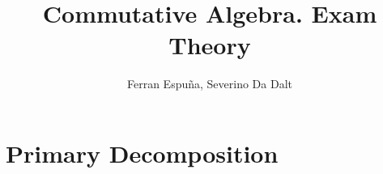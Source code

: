 \documentclass[11pt]{article}
\title{Commutative Algebra. Exam Theory}
\author{Ferran Espuña, Severino Da Dalt}
\theoremstyle{definition}
\begin{document}
    \maketitle

    \section{Primary Decomposition}\label{sec:primary-decomposition}
    
\end{document}
